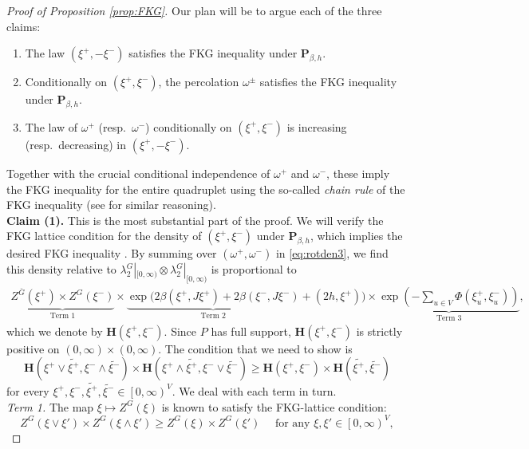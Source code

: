 \documentclass{article}
\numberwithin{equation}{section}
\theoremstyle{definition}
\theoremstyle{definition}
\theoremstyle{remark}
\newcommand{\w}{\omega}
\renewcommand{\l}{\lambda}
\newcommand{\I}{\Phi}
\renewcommand{\P}{\mathrm{\mathbf{P}}}
\renewcommand{\L}{\xi}
\renewcommand{\H}{\mathbf{H}}
\begin{document}
\begin{proof}[Proof of Proposition \ref{prop:FKG}]
	Our plan will be to argue each of the three claims:
	\begin{enumerate}[(1)]
		\item The law $(\L^+,-\L^-)$ satisfies the FKG inequality under $\P_{\beta,h}$.
		\item Conditionally on $(\L^+,\L^-)$, the percolation $\w^\pm$ satisfies the FKG inequality under $\P_{\beta,h}$. 
		\item The law of $\w^+$ (resp.~$\w^-$) conditionally on $(\L^+,\L^-)$ is increasing (resp.~decreasing) in $(\L^+,-\L^-)$.
	\end{enumerate}
	Together with the crucial conditional independence of $\w^+$ and $\w^-$, these imply the FKG inequality for the entire quadruplet using the so-called \emph{chain rule} of the FKG inequality (see \cite[Proposition 3.10]{glazman2025delocalisation} for similar reasoning). 
	\\[1em]
	\noindent\textbf{Claim (1). }This is the most substantial part of the proof. We will verify the FKG lattice condition for the density of $(\L^+,\L^-)$ under $\P_{\beta,h}$, which implies the desired FKG inequality \cite{FKG}. By summing over $(\w^+,\w^-)$ in \eqref{eq:rotden3}, we find this density relative to $\l_2^G|_{[0,\infty)} \otimes \l_2^G|_{[0,\infty)}$ is proportional to
	\begin{multline}\label{eq:absden}
	\underbrace{Z^{ \overline{G}}(\L^+) \times Z^G(\L^-)}_{\text{Term 1}} \times  \underbrace{ \exp( 2\beta(\L^+,J\L^+) + 2\beta (\L^-,J\L^-)}_{\text{Term 2}} + (2h,\L^+)) \times  \underbrace{\exp( -\textstyle\sum_{u \in V}\I(\L^+_u,\L_u^-) )}_{\text{Term 3}},
	\end{multline} 
	which we denote by $\H(\L^+,\L^-)$. Since $P$ has full support, $\H(\L^+,\L^-)$ is strictly positive on $(0,\infty) \times (0,\infty)$. 
	The condition that we need to show is
	\[
		\H(\L^+ \vee \widetilde{\L^+}, \L^- \wedge \widetilde{\L^-}) \times \H(\L^+ \wedge \widetilde{\L^+},\L^- \vee \widetilde{\L^-}) \geq \H(\L^+,\L^-) \times \H( \widetilde{\L^+}, \widetilde{\L^-}) 
	\]
for every $\L^+,\L^-, \widetilde{\L^+}, \widetilde{\L^-} \in \left[ 0,\infty\right)^V$.
	We deal with each term in turn. 
	\\[1em]
	\noindent\emph{Term 1. }The map $\L \mapsto Z^G(\L)$ is known to satisfy the FKG-lattice condition: 
	\[
		Z^G(\L \vee \L') \times Z^G(\L \wedge \L') \geq Z^G(\L) \times Z^G(\L') \quad\text{ for any } \L,\L' \in \left[ 0,\infty\right)^V, 
	\] 

\end{proof}
\end{document}
